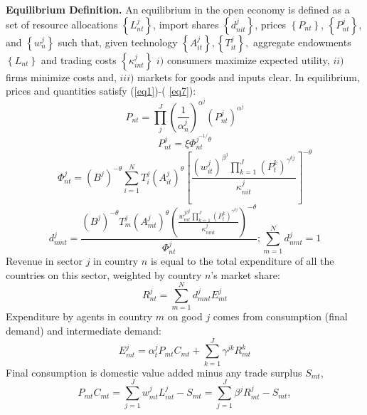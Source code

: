 \documentclass[12pt]{article}
\begin{document}
\textbf{Equilibrium Definition. } An equilibrium in the open economy is
defined as a set of resource allocations $\left\{ L_{nt}^{j}\right\} $,
import shares $\left\{ d_{nit}^{j}\right\} $, prices $\left\{ P_{nt}\right\} 
$, $\left\{ P_{nt}^{j}\right\} $, and $\left\{ w_{n}^{j}\right\} $ such
that, given technology $\left\{ A_{it}^{j}\right\} ,\left\{
T_{it}^{j}\right\} ,$ aggregate endowments $\left\{ L_{nt}\right\} $ and
trading costs $\left\{ \kappa _{int}^{j}\right\} $ $i)$ consumers maximize
expected utility, $ii)$ firms minimize costs and, $iii)$ markets for goods
and inputs clear. In equilibrium, prices and quantities satisfy (\ref{eq1})-(%
\ref{eq7}): 
\begin{equation}
P_{nt}=\prod_{j}^{J}\left( \frac{1}{\alpha _{n}^{j}}\right) ^{\alpha
^{j}}\left( P_{nt}^{j}\right) ^{\alpha ^{j}}  \label{eq1}
\end{equation}%
\begin{equation}
P_{nt}^{j}=\xi \Phi _{nt}^{j^{-1/}\theta }  \label{eq2}
\end{equation}%
\begin{equation}
\Phi _{nt}^{j}=\left( B^{j}\right) ^{-\theta }\sum_{i=1}^{N}T_{i}^{j}\left(
A_{it}^{j}\right) ^{\theta }\left[ \frac{\left( w_{it}^{j}\right) ^{\beta
^{j}}\prod_{k=1}^{J}(P_{t}^{k})^{\gamma ^{kj}}}{\kappa _{nit}^{j}}\right]
^{-\theta }  \label{eq3}
\end{equation}%
\begin{equation}
d_{nmt}^{j}=\frac{\left( B^{j}\right) ^{-\theta }T_{m}^{j}\left(
A_{mt}^{j}\right) ^{\theta }\left( \frac{w_{mt}^{j\beta
^{j}}\prod_{k=1}^{J}(P_{t}^{k})^{\gamma ^{kj}}}{\kappa _{nmt}^{j}}\right)
^{-\theta }}{\Phi _{nt}^{j}};\sum\limits_{m=1}^{N}d_{nmt}^{j}=1  \label{eq4}
\end{equation}%
Revenue in sector $j$ in country $n$ is equal to the total expenditure of
all the countries on this sector, weighted by country $n$'s market share: 
\begin{equation*}
R_{nt}^{j}=\sum_{m=1}^{N}d_{mnt}^{j}E_{mt}^{j}
\end{equation*}%
Expenditure by agents in country $m$ on good $j$ comes from consumption
(final demand) and intermediate demand: 
\begin{equation*}
E_{mt}^{j}=\alpha _{t}^{j}P_{mt}C_{mt}+\sum_{k=1}^{J}\gamma ^{jk}R_{mt}^{k}
\end{equation*}%
Final consumption is domestic value added minus any trade surplus $S_{mt}$, 
\begin{equation*}
P_{mt}C_{mt}=\sum_{j=1}^{J}w_{mt}^{j}L_{mt}^{j}-S_{mt}=\sum_{j=1}^{J}\beta
^{j}R_{mt}^{j}-S_{mt},
\end{equation*}%
\end{document}
